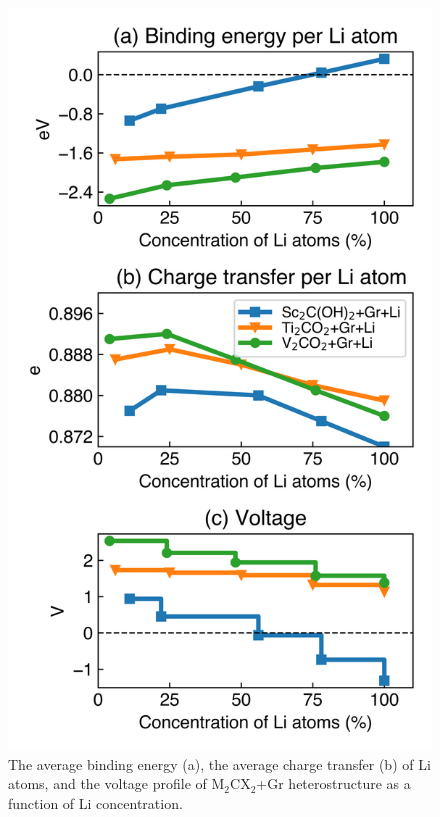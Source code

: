 \begin{figure}[htbp]
\centering
\includegraphics[width=0.6\linewidth]{Li_con.png}%
\caption{The average binding energy (a), the average charge transfer (b) of Li atoms, and the voltage profile of M$_2$CX$_2$+Gr heterostructure as a function of Li concentration. \label{concenration}}
\end{figure}

